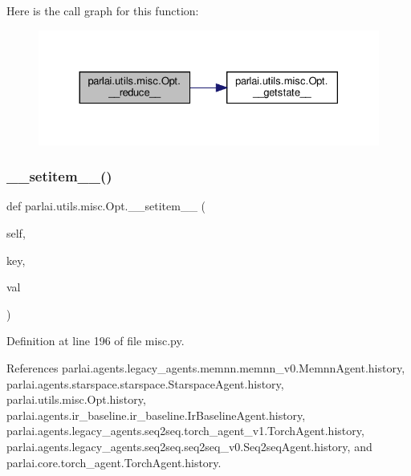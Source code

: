 Here is the call graph for this function\+:
\nopagebreak
\begin{figure}[H]
\begin{center}
\leavevmode
\includegraphics[width=330pt]{classparlai_1_1utils_1_1misc_1_1Opt_a1304900ba795187adb8bd4a564a435a8_cgraph}
\end{center}
\end{figure}
\mbox{\label{classparlai_1_1utils_1_1misc_1_1Opt_a479b52d2a5f00e4b9aac417ee4990915}} 
\subsubsection{\texorpdfstring{\+\_\+\+\_\+setitem\+\_\+\+\_\+()}{\_\_setitem\_\_()}}
{\footnotesize\ttfamily def parlai.\+utils.\+misc.\+Opt.\+\_\+\+\_\+setitem\+\_\+\+\_\+ (\begin{DoxyParamCaption}\item[{}]{self,  }\item[{}]{key,  }\item[{}]{val }\end{DoxyParamCaption})}



Definition at line 196 of file misc.\+py.



References parlai.\+agents.\+legacy\+\_\+agents.\+memnn.\+memnn\+\_\+v0.\+Memnn\+Agent.\+history, parlai.\+agents.\+starspace.\+starspace.\+Starspace\+Agent.\+history, parlai.\+utils.\+misc.\+Opt.\+history, parlai.\+agents.\+ir\+\_\+baseline.\+ir\+\_\+baseline.\+Ir\+Baseline\+Agent.\+history, parlai.\+agents.\+legacy\+\_\+agents.\+seq2seq.\+torch\+\_\+agent\+\_\+v1.\+Torch\+Agent.\+history, parlai.\+agents.\+legacy\+\_\+agents.\+seq2seq.\+seq2seq\+\_\+v0.\+Seq2seq\+Agent.\+history, and parlai.\+core.\+torch\+\_\+agent.\+Torch\+Agent.\+history.

